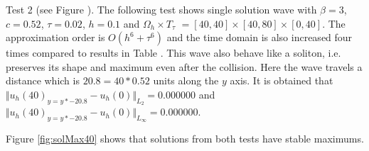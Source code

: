 \documentclass[11pt,a4paper,twoside]{article}
\begin{document}
\iffalse
Test 2 (see Figure ). The following test shows single solution wave with $\beta = 3$, $c = 0.52$, $\tau = 0.02$, $h = 0.1$ and $\Omega_h \times T_{\tau}$ $= [40, 40] \times [40, 80] \times [0, 40]$. The approximation order is $O(h^6 + \tau^6)$ and the time domain is also increased four times compared to results in Table . This wave also behave like a soliton, i.e. preserves its shape and maximum even after the collision. Here the wave travels a distance which is $20.8 = 40*0.52$ units along the $y$ axis. It is obtained that $\Vert u_h(40)_{y = y*-20.8} - u_h(0) \Vert_{L_2} = 0.000000$ and $\Vert u_h(40)_{y = y*-20.8} - u_h(0) \Vert_{L_\infty} = 0.000000$.

Figure \ref{fig:solMax40} shows that solutions from both tests have stable maximums.
\end{document}
